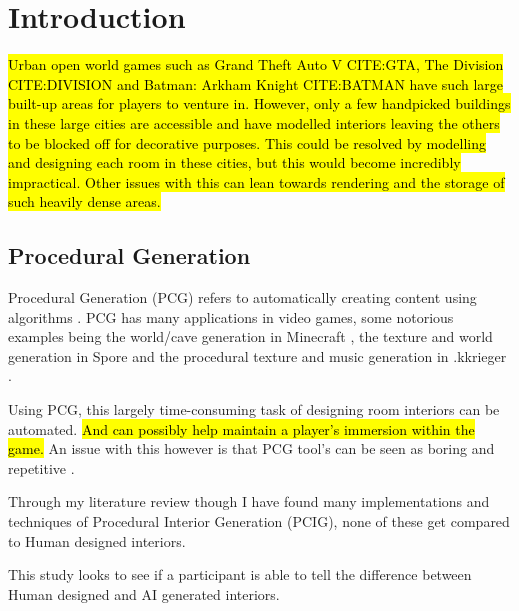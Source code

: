 \section{Introduction}

\hl{Urban open world games such as Grand Theft Auto V CITE:GTA, The Division CITE:DIVISION and Batman: Arkham Knight CITE:BATMAN have such large built-up areas for players to venture in. However, only a few handpicked buildings in these large cities are accessible and have  modelled interiors leaving the others to be blocked off for decorative purposes. This could be resolved by modelling and designing each room in these cities, but this would become incredibly impractical. Other issues with this can lean towards rendering and the storage of such heavily dense areas.}

\subsection*{Procedural Generation}
Procedural Generation (PCG) refers to automatically creating content using algorithms \cite{what-is-pcg}. PCG has many applications in video games, some notorious examples being the world/cave generation in Minecraft \cite{game:minecraft}, the texture\cite{game:spore-texture} and world generation\cite{game:spore-world} in Spore \cite{game:spore} and the procedural texture and music generation in .kkrieger \cite{game:kkreiger}.

Using PCG, this largely time-consuming task of designing room interiors can be automated. \hl{And can possibly help maintain a player's immersion within the game.} An issue with this however is that PCG tool's can be seen as boring and repetitive \cite{pcg_in_gd}.

Through my literature review though I have found many implementations and techniques of Procedural Interior Generation (PCIG), none of these get compared to Human designed interiors. 
\bigskip

This study looks to see if a participant is able to tell the difference between Human designed and AI generated interiors.

